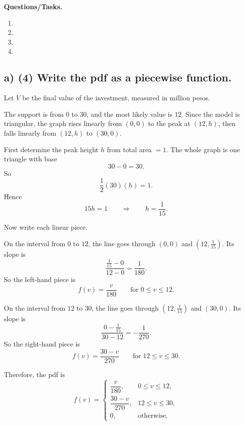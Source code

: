 \textbf{Questions/Tasks.}
\begin{enumerate}[label=\textbf{\alph*)}]
	\item {}
	\item {}
	\item {}
	\item {}
\end{enumerate}


\subsection*{a) \textbf{(4)} Write the pdf as a piecewise function.}
\label{subsec:small-business-investment-c3-a}
Let $V$ be the final value of the investment, measured in million pesos.

The support is from $0$ to $30$, and the most likely value is $12$. Since the model is triangular, the graph rises linearly from $(0,0)$ to the peak at $(12,h)$, then falls linearly from $(12,h)$ to $(30,0)$.

First determine the peak height $h$ from total area $=1$. The whole graph is one triangle with base
\[
30-0=30.
\]
So
\[
\frac12(30)(h)=1.
\]
Hence
\[
15h=1
\qquad \Rightarrow \qquad
h=\frac{1}{15}.
\]

Now write each linear piece.

On the interval from $0$ to $12$, the line goes through $(0,0)$ and $(12,\tfrac{1}{15})$. Its slope is
\[
\frac{\tfrac{1}{15}-0}{12-0}=\frac{1}{180}.
\]
So the left-hand piece is
\[
f(v)=\frac{v}{180}\qquad \text{for }0\le v\le 12.
\]

On the interval from $12$ to $30$, the line goes through $(12,\tfrac{1}{15})$ and $(30,0)$. Its slope is
\[
\frac{0-\tfrac{1}{15}}{30-12}=-\frac{1}{270}.
\]
So the right-hand piece is
\[
f(v)=\frac{30-v}{270}\qquad \text{for }12\le v\le 30.
\]

Therefore, the pdf is
\[
f(v)=
\begin{cases}
	\dfrac{v}{180}, & 0\le v\le 12,\\[6pt]
	\dfrac{30-v}{270}, & 12\le v\le 30,\\[6pt]
	0, & \text{otherwise.}
\end{cases}
\]


